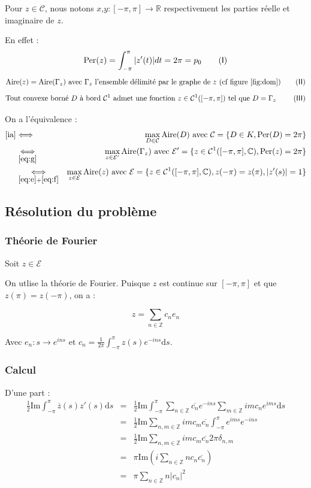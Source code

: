 \documentclass[10pt,a4paper]{article}
\newcommand{\R}{\mathbb{R}}
\newcommand{\Z}{\mathbb{Z}}
\newcommand{\C}{\mathcal{C}}
\renewcommand{\d}{\mathrm{d}}
\newcommand{\A}{\mathrm{Aire}}
\newcommand{\p}{\mathrm{Per}}
\renewcommand{\Im}{\mathrm{Im}}
\theoremstyle{plain}
\theoremstyle{definition}
\begin{document}
Pour $z\in \mathcal{C}$, nous notons $x$,$y : [-\pi,\pi] \rightarrow \R$ respectivement les parties réelle et imaginaire de $z$.

En effet :
\[ \p(z) = \int_{-\pi}^{\pi}{|z'(t)|dt} = 2\pi = p_0 \label{eq:e}\tag{\textsf{I}}\]
\[ \A(z) = \A(\Gamma_z) \text{ avec $\Gamma_z$ l'ensemble délimité par le graphe de $z$ (cf figure \ref{fig:dom})} \label{eq:f}\tag{\textsf{II}}\]
\[ \text{Tout convexe borné $D$ à bord $\C^1$ admet une fonction $z \in \C^1([-\pi,\pi])$ tel que $D=\Gamma_z$ } \label{eq:g}\tag{\textsf{III}}\]

On a l'équivalence :
\begin{eqnarray*}
\ref{ia} &\Longleftrightarrow& \max_{D \in \C} \A(D) \text{ avec } \C = \{ D \in K, \p(D) = 2\pi \} \\
&\underset{\ref{eq:g}}{\Longleftrightarrow}& \max_{z \in \mathcal{E}'} \A(\Gamma_z) \text{ avec } \mathcal{E}' = \{ z \in \C^1([-\pi,\pi],\mathbb{C}), \p(z) = 2\pi \} \\
&\underset{\ref{eq:e}+\ref{eq:f}}{\Longleftrightarrow}& \max_{z \in \mathcal{E}} \A(z) \text{ avec } \mathcal{E} = \{ z \in \C^1([-\pi,\pi],\mathbb{C}),  z(-\pi)=z(\pi), |z'(s)|=1 \}
\end{eqnarray*}

\subsection[Résolution du problème]{Résolution du problème \cite{fuglede86}}


\subsubsection{Théorie de Fourier}

Soit $z \in \mathcal{E}$

On utlise la théorie de Fourier. Puisque $z$ est continue sur $[-\pi,\pi]$ et que $z(\pi)=z(-\pi)$, on a :

\[ z = \sum_{n \in \Z}{c_n e_n} \]

Avec $e_n: s \rightarrow e^{ins}$ et $c_n = \frac{1}{2\pi} \int_{-\pi}^{\pi}{z(s)e^{-ins}\d s}$.

\subsubsection{Calcul}

D'une part :
\begin{eqnarray*}
\frac{1}{2} \Im \int_{-\pi}^{\pi}{\overline{z}(s) z'(s) \d s} &=& \frac{1}{2} \Im \int_{-\pi}^{\pi}{ \sum_{n\in \Z}{\overline{c_n} e^{-ins}} \sum_{m\in \Z}{imc_n e^{ims}} \d s}\\
&=& \frac{1}{2} \Im \sum_{n,m\in \Z}{ im c_m \overline{c_n} \int_{-\pi}^{\pi}{e^{ims}e^{-ins}} } \\
&=& \frac{1}{2} \Im \sum_{n,m\in \Z}{ im c_m \overline{c_n} 2\pi \delta_{n,m} } \\
&=& \pi \Im\left( i\sum_{n\in \Z}{ n c_n \overline{c_n}}\right) \\
&=& \pi \sum_{n\in \Z}{ n |c_n|^2}
\end{eqnarray*}
\end{document}

